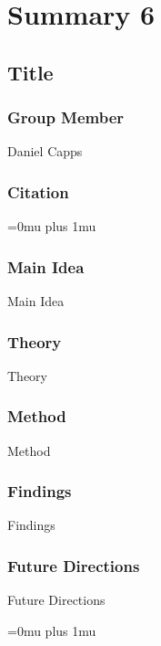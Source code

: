 \section{Summary 6}

\noindent
\subsection{Title}

\subsubsection{Group Member}

\noindent
Daniel Capps

\noindent
\subsubsection{Citation}

\Urlmuskip=0mu plus 1mu\relax

\subsubsection{Main Idea}

\noindent
Main Idea

\subsubsection{Theory}

\noindent
Theory

\subsubsection{Method}

\noindent
Method

\subsubsection{Findings}

\noindent
Findings

\subsubsection{Future Directions}

\noindent
Future Directions 

\Urlmuskip=0mu plus 1mu\relax

